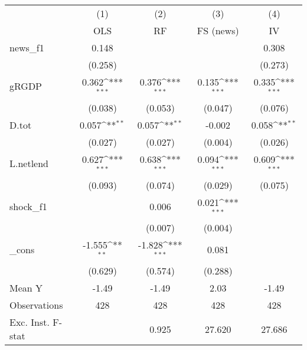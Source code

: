 {
\def\sym#1{\ifmmode^{#1}\else\(^{#1}\)\fi}
\begin{tabular}{l*{4}{c}}
\toprule
            &\multicolumn{1}{c}{(1)}&\multicolumn{1}{c}{(2)}&\multicolumn{1}{c}{(3)}&\multicolumn{1}{c}{(4)}\\
            &\multicolumn{1}{c}{OLS}&\multicolumn{1}{c}{RF}&\multicolumn{1}{c}{FS (news)}&\multicolumn{1}{c}{IV}\\
\midrule
news\_f1     &       0.148         &                     &                     &       0.308         \\
            &     (0.258)         &                     &                     &     (0.273)         \\
\addlinespace
gRGDP       &       0.362\sym{***}&       0.376\sym{***}&       0.135\sym{***}&       0.335\sym{***}\\
            &     (0.038)         &     (0.053)         &     (0.047)         &     (0.076)         \\
\addlinespace
D.tot       &       0.057\sym{**} &       0.057\sym{**} &      -0.002         &       0.058\sym{**} \\
            &     (0.027)         &     (0.027)         &     (0.004)         &     (0.026)         \\
\addlinespace
L.netlend   &       0.627\sym{***}&       0.638\sym{***}&       0.094\sym{***}&       0.609\sym{***}\\
            &     (0.093)         &     (0.074)         &     (0.029)         &     (0.075)         \\
\addlinespace
shock\_f1    &                     &       0.006         &       0.021\sym{***}&                     \\
            &                     &     (0.007)         &     (0.004)         &                     \\
\addlinespace
\_cons      &      -1.555\sym{**} &      -1.828\sym{***}&       0.081         &                     \\
            &     (0.629)         &     (0.574)         &     (0.288)         &                     \\
\midrule
Mean Y      &       -1.49         &       -1.49         &        2.03         &       -1.49         \\
Observations&         428         &         428         &         428         &         428         \\
Exc. Inst. F-stat&                     &       0.925         &      27.620         &      27.686         \\
\bottomrule
\end{tabular}
}
